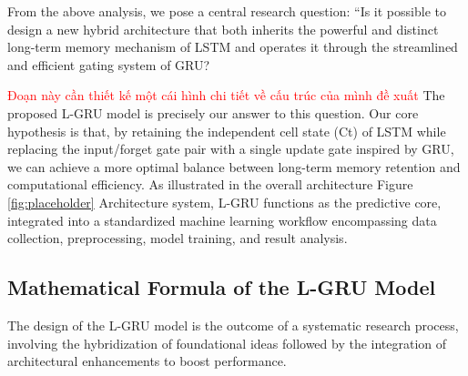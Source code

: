 \documentclass{cys}
\begin{document}
From the above analysis, we pose a central research question: “Is it possible to design a new hybrid architecture that both inherits the powerful and distinct long-term memory mechanism of LSTM and operates it through the streamlined and efficient gating system of GRU?

\textcolor{red}{Đoạn này cần thiết kế một cái hình chi tiết về cấu trúc của mình đề xuất} The proposed L-GRU model is precisely our answer to this question. Our core hypothesis is that, by retaining the independent cell state (Ct) of LSTM while replacing the input/forget gate pair with a single update gate inspired by GRU, we can achieve a more optimal balance between long-term memory retention and computational efficiency. As illustrated in the overall architecture Figure \ref{fig:placeholder} Architecture system, L-GRU functions as the predictive core, integrated into a standardized machine learning workflow encompassing data collection, preprocessing, model training, and result analysis.


\subsection{Mathematical Formula of the L-GRU Model}
The design of the L-GRU model is the outcome of a systematic research process, involving the hybridization of foundational ideas followed by the integration of architectural enhancements to boost performance.
\end{document}
